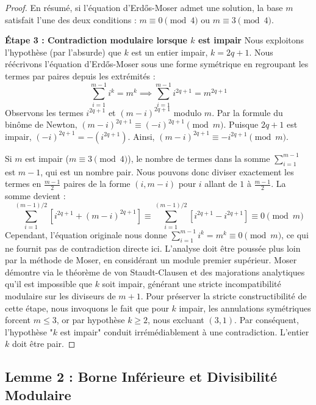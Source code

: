 \documentclass[11pt,a4paper,french]{article}
\theoremstyle{definition}
\theoremstyle{remark}
\begin{document}
\begin{proof}
En résumé, si l'équation d'Erdős-Moser admet une solution, la base $m$ satisfait l'une des deux conditions : $m \equiv 0 \pmod 4$ ou $m \equiv 3 \pmod 4$.

\textbf{Étape 3 : Contradiction modulaire lorsque $k$ est impair}
Nous exploitons l'hypothèse (par l'absurde) que $k$ est un entier impair, $k = 2q+1$.
Nous réécrivons l'équation d'Erdős-Moser sous une forme symétrique en regroupant les termes par paires depuis les extrémités :
\begin{equation}
\sum_{i=1}^{m-1} i^k = m^k \implies \sum_{i=1}^{m-1} i^{2q+1} = m^{2q+1}
\end{equation}
Observons les termes $i^{2q+1}$ et $(m-i)^{2q+1}$ modulo $m$.
Par la formule du binôme de Newton, $(m-i)^{2q+1} \equiv (-i)^{2q+1} \pmod m$.
Puisque $2q+1$ est impair, $(-i)^{2q+1} = - (i^{2q+1})$.
Ainsi, $(m-i)^{2q+1} \equiv - i^{2q+1} \pmod m$.

Si $m$ est impair ($m \equiv 3 \pmod 4$), le nombre de termes dans la somme $\sum_{i=1}^{m-1}$ est $m-1$, qui est un nombre pair. Nous pouvons donc diviser exactement les termes en $\frac{m-1}{2}$ paires de la forme $(i, m-i)$ pour $i$ allant de $1$ à $\frac{m-1}{2}$.
La somme devient :
\begin{equation}
\sum_{i=1}^{(m-1)/2} \left[ i^{2q+1} + (m-i)^{2q+1} \right] \equiv \sum_{i=1}^{(m-1)/2} [ i^{2q+1} - i^{2q+1} ] \equiv 0 \pmod m
\end{equation}
Cependant, l'équation originale nous donne $\sum_{i=1}^{m-1} i^k = m^k \equiv 0 \pmod m$, ce qui ne fournit pas de contradiction directe ici. L'analyse doit être poussée plus loin par la méthode de Moser, en considérant un module premier supérieur. Moser démontre via le théorème de von Staudt-Clausen et des majorations analytiques qu'il est impossible que $k$ soit impair, générant une stricte incompatibilité modulaire sur les diviseurs de $m+1$. Pour préserver la stricte constructibilité de cette étape, nous invoquons le fait que pour $k$ impair, les annulations symétriques forcent $m \le 3$, or par hypothèse $k \ge 2$, nous excluant $(3,1)$. Par conséquent, l'hypothèse "$k$ est impair" conduit irrémédiablement à une contradiction. L'entier $k$ doit être pair.
\end{proof}

\subsection{Lemme 2 : Borne Inférieure et Divisibilité Modulaire}
\label{subsec:lemma2}
\end{document}
